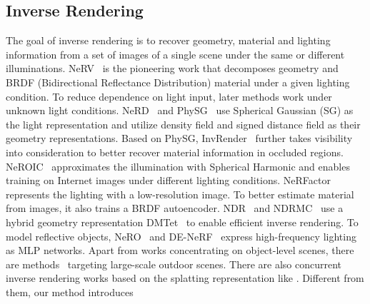 \subsection{Inverse Rendering}
The goal of inverse rendering is to recover geometry, material and lighting information from a set of images of a single scene under the same or different illuminations. 
NeRV~\cite{NeRV} is the pioneering work that decomposes geometry and BRDF (Bidirectional Reflectance Distribution) material under a given lighting condition. 
To reduce dependence on light input, later methods work under unknown light conditions. 
NeRD~\cite{NeRD} and PhySG~\cite{PhySG} use Spherical Gaussian (SG) as the light representation and utilize  density field and  signed distance field as their geometry representations. 
Based on PhySG, InvRender~\cite{invrender} further takes visibility into consideration to better recover material information in occluded regions. 
NeROIC~\cite{NeROIC} approximates the illumination with Spherical Harmonic  and enables training on Internet images under different lighting conditions. 
NeRFactor~\cite{NeRFactor} represents the lighting with a low-resolution image. 
To better estimate material from images, it also trains a BRDF autoencoder. 
NDR~\cite{NvDiffRec} and NDRMC~\cite{nvdiffrecmc} use a hybrid geometry representation DMTet~\cite{shen2021deep} to enable efficient inverse rendering. 
To model reflective objects, NeRO~\cite{NeRO} and DE-NeRF~\cite{DE-NeRF} express high-frequency lighting as MLP networks. 
Apart from works concentrating on object-level scenes, there are methods~\cite{NeRF-OSR, FEGR, SOL-NeRF} targeting large-scale outdoor scenes.  
There are also concurrent inverse rendering works based on the  splatting representation like \cite{RelightableGaussian, GS-IR, GIR, GaussianShader}. 
Different from them, our method introduces 




